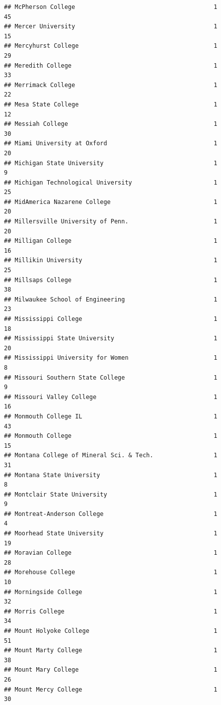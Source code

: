\documentclass[
]{article}
\begin{document}
\begin{verbatim}
## McPherson College                                       1          45
## Mercer University                                       1          15
## Mercyhurst College                                      1          29
## Meredith College                                        1          33
## Merrimack College                                       1          22
## Mesa State College                                      1          12
## Messiah College                                         1          30
## Miami University at Oxford                              1          20
## Michigan State University                               1           9
## Michigan Technological University                       1          25
## MidAmerica Nazarene College                             1          20
## Millersville University of Penn.                        1          20
## Milligan College                                        1          16
## Millikin University                                     1          25
## Millsaps College                                        1          38
## Milwaukee School of Engineering                         1          23
## Mississippi College                                     1          18
## Mississippi State University                            1          20
## Mississippi University for Women                        1           8
## Missouri Southern State College                         1           9
## Missouri Valley College                                 1          16
## Monmouth College IL                                     1          43
## Monmouth College                                        1          15
## Montana College of Mineral Sci. & Tech.                 1          31
## Montana State University                                1           8
## Montclair State University                              1           9
## Montreat-Anderson College                               1           4
## Moorhead State University                               1          19
## Moravian College                                        1          28
## Morehouse College                                       1          10
## Morningside College                                     1          32
## Morris College                                          1          34
## Mount Holyoke College                                   1          51
## Mount Marty College                                     1          38
## Mount Mary College                                      1          26
## Mount Mercy College                                     1          30

\end{verbatim}
\end{document}
